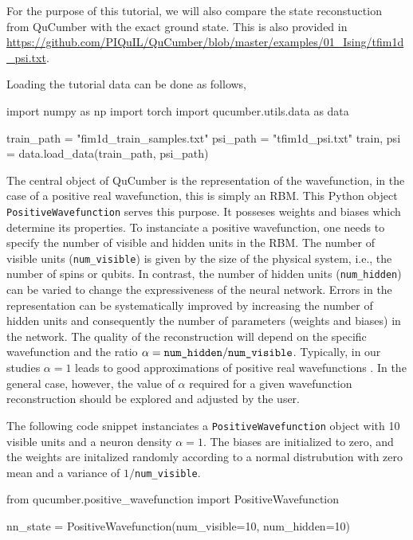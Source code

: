 \documentclass[submission, Phys]{SciPost}
\begin{document}
For the purpose of this tutorial, we will also compare the state reconstuction from QuCumber with the exact ground state.
This is also provided in \url{https://github.com/PIQuIL/QuCumber/blob/master/examples/01_Ising/tfim1d_psi.txt}.

Loading the tutorial data can be done as follows,
\begin{python}
	import numpy as np
	import torch
	import qucumber.utils.data as data

	train_path = "fim1d_train_samples.txt"
	psi_path = "tfim1d_psi.txt"
	train, psi = data.load_data(train_path, psi_path)
\end{python}

The central object of QuCumber is the representation of the wavefunction, in the case of a positive real wavefunction, this is simply an RBM.
This Python object \verb|PositiveWavefunction| serves this purpose.
It posseses weights and biases which determine its properties.
To instanciate a positive wavefunction, one needs to specify the number of visible and hidden units in the RBM.
The number of visible units (\verb|num_visible|) is given by the size of the physical system, i.e., the number of spins or qubits.
In contrast, the number of hidden units (\verb|num_hidden|) can be varied to change the expressiveness of the neural network.
Errors in the representation can be systematically improved by increasing the number of hidden units and consequently
the number of parameters (weights and biases) in the network.
The quality of the reconstruction will depend on the specific wavefunction and the ratio $\alpha = \verb|num_hidden|/\verb|num_visible|$.
Typically, in our studies $\alpha = 1$ leads to good approximations of positive real wavefunctions \cite{Torlai2016thermo}.
In the general case, however, the value of $\alpha$ required for a given wavefunction reconstruction should be explored and adjusted by the user.

The following code snippet instanciates a \verb|PositiveWavefunction| object with 10 visible units and a neuron density $\alpha=1$.
The biases are initialized to zero, and the weights are initalized randomly according to a normal distrubution with zero mean and a variance of $1/$\verb|num_visible|.

\begin{python}
	from qucumber.positive_wavefunction import PositiveWavefunction

	nn_state = PositiveWavefunction(num_visible=10, num_hidden=10)
\end{python}
\end{document}
